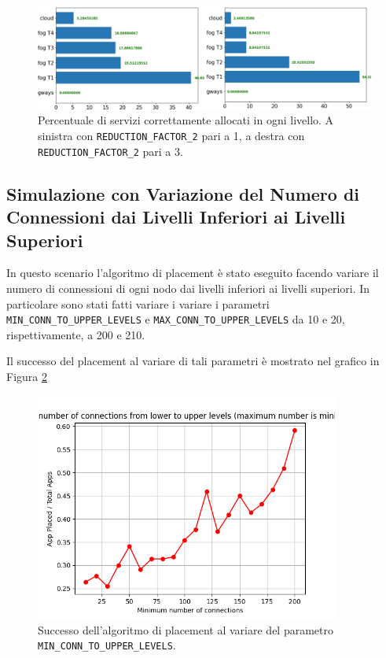 \begin{figure}[!ht]
  \includegraphics[width=14cm]{images/reduction_factor_placement_comparison}
  \centering
  \caption{Percentuale di servizi correttamente allocati in ogni livello. A sinistra con \texttt{REDUCTION\_FACTOR\_2} pari a 1, a destra con \texttt{REDUCTION\_FACTOR\_2} pari a 3.}
  \label{fig:reduction_factor_placement_comparison}
\end{figure}

\subsection{Simulazione con Variazione del Numero di Connessioni dai Livelli Inferiori ai Livelli Superiori}

In questo scenario l'algoritmo di placement è stato eseguito facendo variare il numero di connessioni di ogni nodo dai livelli inferiori ai livelli superiori. In particolare sono stati fatti variare i variare i parametri \texttt{MIN\_CONN\_TO\_UPPER\_LEVELS} e \texttt{MAX\_CONN\_TO\_UPPER\_LEVELS} da 10 e 20, rispettivamente, a 200 e 210.

Il successo del placement al variare di tali parametri è mostrato nel grafico in Figura \ref{fig:minmax_conn_to_upper}

\begin{figure}[!ht]
  \includegraphics[width=10cm]{images/minmax_conn_to_upper}
  \centering
  \caption{Successo dell'algoritmo di placement al variare del parametro \texttt{MIN\_CONN\_TO\_UPPER\_LEVELS}.}
  \label{fig:minmax_conn_to_upper}
\end{figure}


